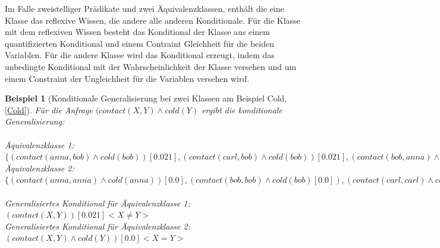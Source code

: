 \documentclass[a4paper, 11pt]{book}
\newtheorem{Bsp}{Beispiel}[section]
\begin{document}
\begin{itemize}
\begin{itemize}
		Im Falle zweistelliger Prädikate und zwei Äquivalenzklassen, enthält die eine Klasse das reflexive Wissen, die andere alle anderen Konditionale. Für die Klasse mit dem reflexiven Wissen besteht das Konditional der Klasse aus einem quantifizierten Konditional und einem Contraint Gleichheit für die beiden Variablen. Für die andere Klasse wird das Konditional erzeugt, indem das unbedingte Konditional mit der Wahrscheinlichkeit der Klasse versehen und um einem Constraint der Ungleichheit für die Variablen versehen wird.
		\begin{Bsp}[Konditionale Generalisierung bei zwei Klassen am Beispiel Cold, \ref{Cold}]
			Für die Anfrage $ (contact(X,Y) \land cold(Y) $ ergibt die konditionale Generalisierung:\\
			\\
		Äquivalenzklasse 1: $ \{(contact(anna,bob) \land cold(bob))[0.021] , (contact(carl, bob) \land cold(bob))[0.021] , (contact(bob, anna) \land cold(anna))[0.021], (contact(anna, carl)\land cold(carl)) [0.021], (contact(bob, carl)\land cold(carl)) [0.021], (contact(carl, anna) \land cold(anna))[0.021] \} $\\
		Äquivalenzklasse 2: $ \{ (contact(anna,anna) \land cold(anna))[0.0], (contact(bob,bob) \land cold(bob)[0.0]), (contact(carl,carl)\land cold(carl))[0.0]\} $\\
		\\
		Generalisiertes Konditional für Äquivalenzklasse 1: $ (contact(X,Y))[0.021] <X \neq Y> $\\
		Generalisiertes Konditional für Äquivalenzklasse 2: $ (contact(X,Y) \land cold(Y))[0.0] <X = Y> $\\
		\end{Bsp}
	\end{itemize}
\end{itemize}
\end{document}
